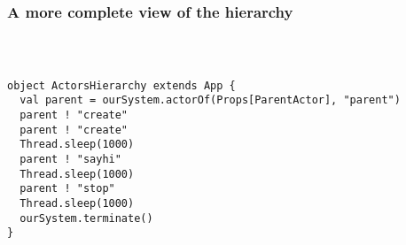\documentclass[aspectratio=169]{beamer}
\begin{document}
\begin{frame}[fragile]\frametitle{A more complete view of the hierarchy}
~\\[-6mm]
\begin{columns}
\begin{column}{0.57\textwidth}
\begin{lstlisting}[emph={Actor, Logging, Props, ourSystem,terminate,sleep,actorOf,receive}]
object ActorsHierarchy extends App {
  val parent = ourSystem.actorOf(Props[ParentActor], "parent")
  parent ! "create"
  parent ! "create"
  Thread.sleep(1000)
  parent ! "sayhi"
  Thread.sleep(1000)
  parent ! "stop"
  Thread.sleep(1000)
  ourSystem.terminate()
}\end{lstlisting}
\end{column}
\begin{column}{0.41\textwidth}
  ~\\
\end{column}
\end{columns}
\end{frame}
\end{document}
